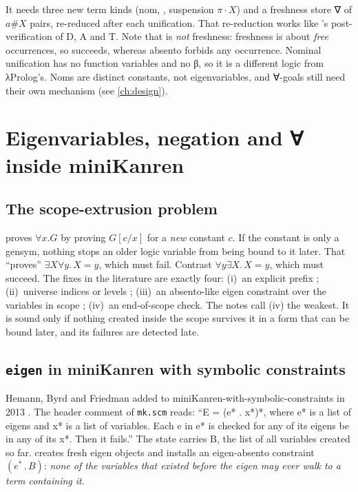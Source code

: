 \begin{kanren}
It needs three new term kinds (nom, , suspension $\pi\cdot X$) and a freshness store ∇ of
$a\#X$ pairs, re-reduced after each unification. That re-reduction works like \micro{}'s
post- verification of D, A and T. Note that  is \emph{not} freshness: freshness is
about \emph{free} occurrences, so  succeeds, whereas absento forbids any
occurrence. Nominal unification has no function variables and no β, so it is a different logic from
λProlog's. Noms are distinct constants, not eigenvariables, and ∀-goals still need their own
mechanism (see \cref{ch:design}).
\end{kanren}

\section{Eigenvariables, negation and ∀ inside miniKanren}\label{sec:lkanren-eigen}

\subsection{The scope-extrusion problem}

 proves $\forall x.G$ by proving $G[c/x]$ for a \emph{new} constant $c$. If the
constant is only a gensym, nothing stops an older logic variable from being bound to it later. That
\enquote{proves} $\exists X\forall y.\,X=y$, which must fail. Contrast $\forall y\exists X.\,X=y$,
which must succeed. The fixes in the literature are exactly four:
(i)~an explicit prefix \cite{Miller1991,MaLuFriedman2020}; (ii)~universe indices or levels \cite{NadathurJayaramanKwon1995,DunchevEtAl2015}; (iii)~an absento-like eigen constraint over the variables in scope \cite{HemannByrdFriedman2013}; (iv)~an end-of-scope check.
The notes call (iv) the weakest. It is sound only if nothing created inside the scope survives it in a
form that can be bound later, and its failures are detected late.

\subsection{\texttt{eigen} in miniKanren with symbolic constraints}

Hemann, Byrd and Friedman added  to miniKanren-with-symbolic-constraints in 2013
\cite{HemannByrdFriedman2013}. The header comment of \texttt{mk.scm} reads: \enquote{E = (e* . x*)*,
where e* is a list of eigens and x* is a list of variables. Each e in e* is checked for any of its
eigens be in any of its x*. Then it fails.} The state carries B, the list of all variables created so
far.  creates fresh eigen objects and installs an eigen-absento constraint $(e^*\,.\,B)$:
\emph{none of the variables that existed before the eigen may ever walk to a term containing it}.

